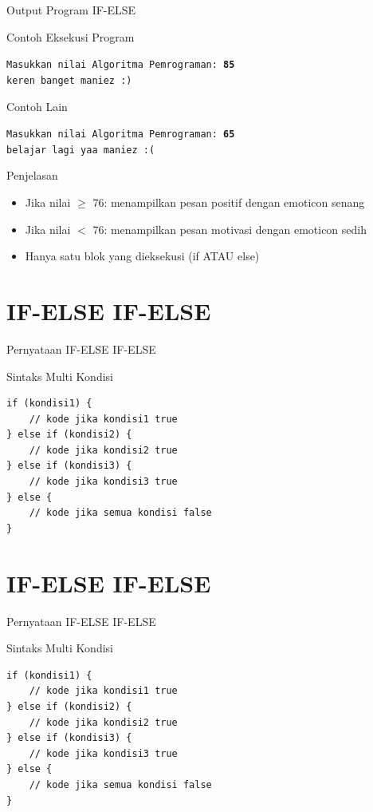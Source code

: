 \documentclass{beamer}
\begin{document}
\begin{frame}{Output Program IF-ELSE}
\begin{block}{Contoh Eksekusi Program}
\colorbox{gray!20}{
    \parbox{0.9\textwidth}{
        \texttt{Masukkan nilai Algoritma Pemrograman: \textbf{85}\\
        keren banget maniez :)}
    }
}
\end{block}

\begin{block}{Contoh Lain}
\colorbox{gray!20}{
    \parbox{0.9\textwidth}{
        \texttt{Masukkan nilai Algoritma Pemrograman: \textbf{65}\\
        belajar lagi yaa maniez :(}
    }
}
\end{block}

\begin{block}{Penjelasan}
\begin{itemize}
\item Jika nilai $\geq$ 76: menampilkan pesan positif dengan emoticon senang
\item Jika nilai $<$ 76: menampilkan pesan motivasi dengan emoticon sedih
\item Hanya satu blok yang dieksekusi (if ATAU else)
\end{itemize}
\end{block}
\end{frame}

\section{IF-ELSE IF-ELSE}
\begin{frame}[fragile]{Pernyataan IF-ELSE IF-ELSE}
  \begin{block}{Sintaks Multi Kondisi}
    \begin{lstlisting}
if (kondisi1) {
    // kode jika kondisi1 true
} else if (kondisi2) {
    // kode jika kondisi2 true
} else if (kondisi3) {
    // kode jika kondisi3 true
} else {
    // kode jika semua kondisi false
}
    \end{lstlisting}
  \end{block}
\end{frame}

\section{IF-ELSE IF-ELSE}
\begin{frame}[fragile]{Pernyataan IF-ELSE IF-ELSE}
  \begin{block}{Sintaks Multi Kondisi}
    \begin{lstlisting}
if (kondisi1) {
    // kode jika kondisi1 true
} else if (kondisi2) {
    // kode jika kondisi2 true
} else if (kondisi3) {
    // kode jika kondisi3 true
} else {
    // kode jika semua kondisi false
}
    \end{lstlisting}
  \end{block}
\end{frame}
\end{document}
